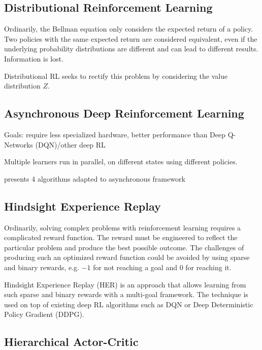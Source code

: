 \documentclass[runningheads]{llncs}
\begin{document}
\subsection{Distributional Reinforcement Learning}

Ordinarily, the Bellman equation only considers the expected return of a policy. Two policies with the same expected return are considered equivalent, even if the underlying probability distributions are different and can lead to different results. Information is lost.

Distributional RL seeks to rectify this problem by considering the value distribution $Z$.\cite{bellemare2017distributional}

\subsection{Asynchronous Deep Reinforcement Learning}

Goals: require less specialized hardware, better performance than Deep Q-Networks (DQN)/other deep RL

Multiple learners run in parallel, on different states using different policies.

\cite{mnih2016asynchronous} presents 4 algorithms adapted to asynchronous framework

\subsection{Hindsight Experience Replay}

Ordinarily, solving complex problems with reinforcement learning requires a complicated reward function. The reward must be engineered to reflect the particular problem and produce the best possible outcome. The challenges of producing such an optimized reward function could be avoided by using sparse and binary rewards, e.g. $-1$ for not reaching a goal and $0$ for reaching it.

Hindsight Experience Replay (HER) \cite{andrychowicz2017hindsight} is an approach that allows learning from such sparse and binary rewards with a multi-goal framework. The technique is used on top of existing deep RL algorithms such as DQN or Deep Deterministic Policy Gradient (DDPG).

\subsection{Hierarchical Actor-Critic}
\end{document}
